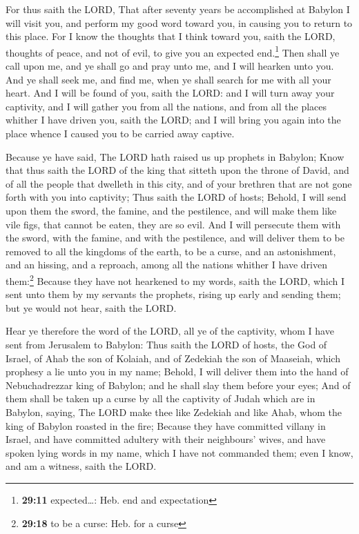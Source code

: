  For thus saith the LORD, That after seventy years be
accomplished at Babylon I will visit you, and perform my good word
toward you, in causing you to return to this place.  For
I know the thoughts that I think toward you, saith the LORD, thoughts of
peace, and not of evil, to give you an expected end.\footnote{\textbf{29:11}
  expected\ldots: Heb. end and expectation}  Then shall
ye call upon me, and ye shall go and pray unto me, and I will hearken
unto you.  And ye shall seek me, and find me, when ye
shall search for me with all your heart.  And I will be
found of you, saith the LORD: and I will turn away your captivity, and I
will gather you from all the nations, and from all the places whither I
have driven you, saith the LORD; and I will bring you again into the
place whence I caused you to be carried away captive.

 Because ye have said, The LORD hath raised us up
prophets in Babylon;  Know that thus saith the LORD of
the king that sitteth upon the throne of David, and of all the people
that dwelleth in this city, and of your brethren that are not gone forth
with you into captivity;  Thus saith the LORD of hosts;
Behold, I will send upon them the sword, the famine, and the pestilence,
and will make them like vile figs, that cannot be eaten, they are so
evil.  And I will persecute them with the sword, with the
famine, and with the pestilence, and will deliver them to be removed to
all the kingdoms of the earth, to be a curse, and an astonishment, and
an hissing, and a reproach, among all the nations whither I have driven
them:\footnote{\textbf{29:18} to be a curse: Heb. for a curse}
 Because they have not hearkened to my words, saith the
LORD, which I sent unto them by my servants the prophets, rising up
early and sending them; but ye would not hear, saith the LORD.

 Hear ye therefore the word of the LORD, all ye of the
captivity, whom I have sent from Jerusalem to Babylon: 
Thus saith the LORD of hosts, the God of Israel, of Ahab the son of
Kolaiah, and of Zedekiah the son of Maaseiah, which prophesy a lie unto
you in my name; Behold, I will deliver them into the hand of
Nebuchadrezzar king of Babylon; and he shall slay them before your eyes;
 And of them shall be taken up a curse by all the
captivity of Judah which are in Babylon, saying, The LORD make thee like
Zedekiah and like Ahab, whom the king of Babylon roasted in the fire;
 Because they have committed villany in Israel, and have
committed adultery with their neighbours' wives, and have spoken lying
words in my name, which I have not commanded them; even I know, and am a
witness, saith the LORD.

